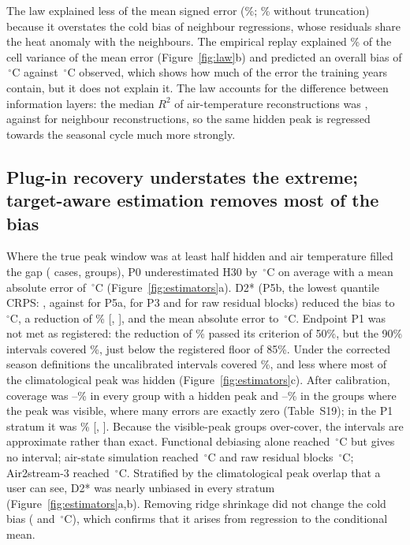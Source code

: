 \documentclass[draft]{agujournal2025}
\begin{document}
The law explained less of the mean signed error (\TLawCellBiasEV\%; \TLawCellBiasEVUntruncated\% without truncation) because it overstates the cold bias of neighbour regressions, whose residuals share the heat anomaly with the neighbours. The empirical replay explained \TReplayCellBiasEV\% of the cell variance of the mean error (Figure~\ref{fig:law}b) and predicted an overall bias of \TReplayBiasMech\,$^{\circ}$C against \TObservedBiasMech\,$^{\circ}$C observed, which shows how much of the error the training years contain, but it does not explain it. The law accounts for the difference between information layers: the median $R^2$ of air-temperature reconstructions was \TLawRTwoAir{}, against \TLawRTwoDonor{} for neighbour reconstructions, so the same hidden peak is regressed towards the seasonal cycle much more strongly.

\subsection{Plug-in recovery understates the extreme; target-aware estimation removes most of the bias}
Where the true peak window was at least half hidden and air temperature filled the gap (\TPOneN{} cases, \TPOneGroups{} groups), P0 underestimated H30 by \TPOneBiasPZeroAbs\,$^{\circ}$C on average with a mean absolute error of \TPOneMaePZero\,$^{\circ}$C (Figure~\ref{fig:estimators}a). D2* (P5b, the lowest quantile CRPS: \TCrpsPFiveB, against \TCrpsPFiveA{} for P5a, \TCrpsPThree{} for P3 and \TCrpsPThreeRaw{} for raw residual blocks) reduced the bias to \TPOneBiasCal\,$^{\circ}$C, a reduction of \TPOneReductionCal\% [\TPOneReductionCalLow, \TPOneReductionCalHigh], and the mean absolute error to \TPOneMae\,$^{\circ}$C. Endpoint P1 was not met as registered: the reduction of \TPOneReductionRone\% passed its criterion of 50\%, but the 90\% intervals covered \TPOneCoverageRone\%, just below the registered floor of 85\%. Under the corrected season definitions the uncalibrated intervals covered \TPOneCoverage\%, and less where most of the climatological peak was hidden (Figure~\ref{fig:estimators}c). After calibration, coverage was \TCqrHardMin--\TCqrHardMax\% in every group with a hidden peak and \TCqrEasyMin--\TCqrEasyMax\% in the groups where the peak was visible, where many errors are exactly zero (Table~S19); in the P1 stratum it was \TPOneCoverageCal\% [\TPOneCoverageCalLow, \TPOneCoverageCalHigh]. Because the visible-peak groups over-cover, the intervals are approximate rather than exact. Functional debiasing alone reached \TPOneBiasPTwo\,$^{\circ}$C but gives no interval; air-state simulation reached \TPOneBiasPThree\,$^{\circ}$C and raw residual blocks \TPOneBiasPThreeRaw\,$^{\circ}$C; Air2stream-3 reached \TAirTwoStreamBias\,$^{\circ}$C. Stratified by the climatological peak overlap that a user can see, D2* was nearly unbiased in every stratum (Figure~\ref{fig:estimators}a,b). Removing ridge shrinkage did not change the cold bias (\TShrinkRidge{} and \TShrinkOls\,$^{\circ}$C), which confirms that it arises from regression to the conditional mean.
\end{document}
